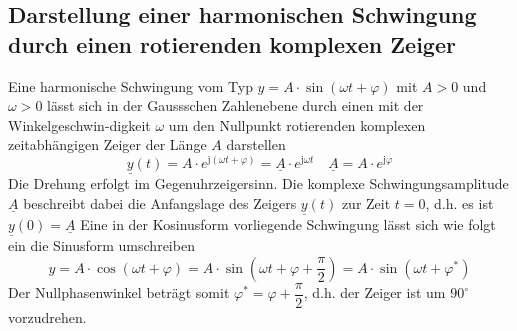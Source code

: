 \subsection{Darstellung einer harmonischen Schwingung durch einen rotierenden komplexen Zeiger}
Eine harmonische Schwingung vom Typ $y=A\cdot\sin\left(\omega t+\varphi\right)$ mit $A>0$ und $\omega>0$ lässt sich in der Gaussschen Zahlenebene durch einen mit der Winkelgeschwin-digkeit $\omega$ um den Nullpunkt rotierenden komplexen zeitabhängigen Zeiger der Länge $A$ darstellen
\begin{equation}
\boxed{\underline{y}\left(t\right)=A\cdot e^{\text{j}\left(\omega t+\varphi\right)}=\underline{A}\cdot e^{\text{j}\omega t}}\quad \boxed{\underline{A}=A\cdot e^{\text{j}\varphi}}
\end{equation}
Die Drehung erfolgt im Gegenuhrzeigersinn. Die komplexe Schwingungsamplitude $\underline{A}$ beschreibt dabei die Anfangslage des Zeigers $\underline{y}\left(t\right)$ zur Zeit $t=0$, d.h. es ist $\underline{y}\left(0\right)=\underline{A}$
\newline\newline
Eine in der Kosinusform vorliegende Schwingung lässt sich wie folgt ein die Sinusform umschreiben
\begin{equation}
\boxed{y=A\cdot \cos\left(\omega t+\varphi\right)=A\cdot \sin\left(\omega t+\varphi+\dfrac{\pi}{2}\right)=A\cdot \sin\left(\omega t+\varphi^*\right)}
\end{equation}
Der Nullphasenwinkel beträgt somit $\varphi^*=\varphi+\dfrac{\pi}{2}$, d.h. der Zeiger ist um $90^{\circ}$ vorzudrehen.
